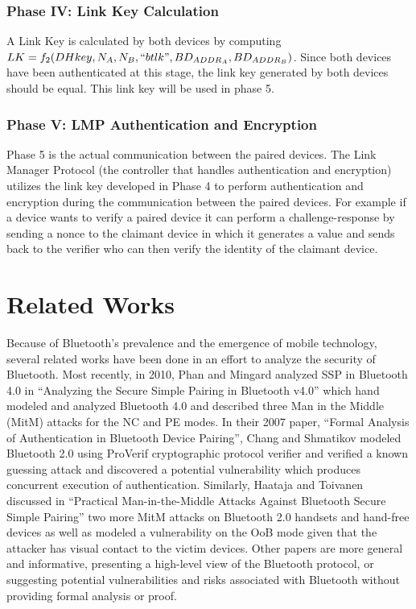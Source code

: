 \documentclass{acm_proc_article-sp}
\begin{document}
\subsubsection{Phase IV: Link Key Calculation}
A Link Key is calculated by both devices by computing $LK = f_2(DHkey, N_{A}, N_{B}, ``btlk", BD_{ADDR_A}, BD_{ADDR_B} )$. Since both devices have been authenticated at this stage, the link key generated by both devices should be equal. This link key will be used in phase 5.

\subsubsection{Phase V: LMP Authentication and Encryption}
Phase 5 is the actual communication between the paired devices. The Link Manager Protocol (the controller that handles authentication and encryption) utilizes the link key developed in Phase 4 to perform authentication and encryption during the communication between the paired devices. For example if a device wants to verify a paired device it can perform a challenge-response by sending a nonce to the claimant device in which it generates a value and sends back to the verifier who can then verify the identity of the claimant device.

\section{Related Works}


Because of Bluetooth's prevalence and the emergence of mobile technology, several related works have been done in an effort to analyze the security of Bluetooth. Most recently, in 2010, Phan and Mingard \cite{phan:mingard} analyzed SSP in Bluetooth 4.0 in ``Analyzing the Secure Simple Pairing in Bluetooth v4.0'' which hand modeled and analyzed Bluetooth 4.0 and described three Man in the Middle (MitM) attacks for the NC and PE modes. In their 2007 paper, ``Formal Analysis of Authentication in Bluetooth Device Pairing'', Chang and Shmatikov \cite{chang:shmatikov} modeled Bluetooth 2.0 using ProVerif cryptographic protocol verifier and verified a known guessing attack and discovered a potential vulnerability which produces concurrent execution of authentication. Similarly, Haataja and Toivanen \cite{haataja:toivanen} discussed in ``Practical Man-in-the-Middle Attacks Against Bluetooth Secure Simple Pairing'' two more MitM attacks on Bluetooth 2.0 handsets and hand-free devices as well as modeled a vulnerability on the OoB mode given that the attacker has visual contact to the victim devices. Other papers are more general and informative, presenting a high-level view of the Bluetooth protocol, or suggesting potential vulnerabilities and risks associated with Bluetooth without providing formal analysis or proof.
\end{document}
